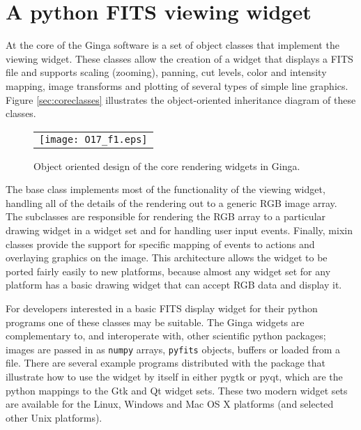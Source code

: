 \documentclass[11pt,twoside]{article}
\begin{document}
\section{A python FITS viewing widget}
At the core of the Ginga software is a set of object classes that
implement the viewing widget.  These classes allow the creation of
a widget that displays a FITS file and supports scaling (zooming),
panning, cut levels, color and intensity mapping, image transforms and
plotting of several types of simple line graphics.   
Figure \ref{sec:coreclasses} illustrates the object-oriented inheritance
diagram of these classes.
\label{sec:coreclasses}
\begin{figure}
  \begin{center}
    \begin{tabular}{c}
      \texttt{[image: O17\_f1.eps]}
    \end{tabular}
  \end{center}
  \caption[example] 
          { \label{fig:onion} 
            Object oriented design of the core rendering widgets in Ginga.} 
\end{figure} 
The base class implements most of the functionality of the viewing
widget, handling all of the details of the rendering out to a generic
RGB image array.
The subclasses are responsible for rendering the RGB array to a
particular drawing widget in a widget set and for handling user input
events. 
Finally, mixin classes \citep{mixins}
provide the support for specific mapping of events to actions and
overlaying graphics on the image.
This architecture allows the widget to be ported fairly easily to new
platforms, because almost any widget set for any platform has a basic
drawing widget that can accept RGB data and display it.

For developers interested in a basic FITS display widget for their
python programs one of these classes may be suitable.
The Ginga widgets are complementary to, and interoperate with, other
scientific python packages; images are passed in as {\tt numpy} arrays,
{\tt pyfits} objects, buffers or loaded from a file.  
There are several 
example programs distributed with the package that illustrate how
to use the widget by itself in either pygtk or pyqt, which are the
python mappings to the Gtk and Qt widget sets. 
These two modern widget sets are available for the Linux, Windows and
Mac OS X platforms (and selected other Unix platforms).
\end{document}

